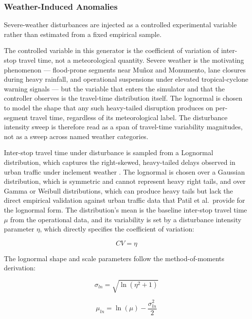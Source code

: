 \subsubsection{Weather-Induced Anomalies}

Severe-weather disturbances are injected as a controlled experimental variable rather than estimated from a fixed empirical sample.

The controlled variable in this generator is the coefficient of variation of inter-stop travel time, not a meteorological quantity. Severe weather is the motivating phenomenon --- flood-prone segments near Mu\~{n}oz and Monumento, lane closures during heavy rainfall, and operational suspensions under elevated tropical-cyclone warning signals \cite{DOTr2020Suspension} --- but the variable that enters the simulator and that the controller observes is the travel-time distribution itself. The lognormal is chosen to model the shape that any such heavy-tailed disruption produces on per-segment travel time, regardless of its meteorological label. The disturbance intensity sweep is therefore read as a span of travel-time variability magnitudes, not as a sweep across named weather categories.

Inter-stop travel time under disturbance is sampled from a Lognormal distribution, which captures the right-skewed, heavy-tailed delays observed in urban traffic under inclement weather \cite{Patil2025Conformal}. The lognormal is chosen over a Gaussian distribution, which is symmetric and cannot represent heavy right tails, and over Gamma or Weibull distributions, which can produce heavy tails but lack the direct empirical validation against urban traffic data that Patil et al.\ provide for the lognormal form. The distribution's mean is the baseline inter-stop travel time $\mu$ from the operational data, and its variability is set by a disturbance intensity parameter $\eta$, which directly specifies the coefficient of variation:

\begin{equation} CV = \eta \label{eq:cv_eta} \end{equation}

The lognormal shape and scale parameters follow the method-of-moments derivation:

\begin{equation} \sigma_{ln} = \sqrt{\ln(\eta^2 + 1)} \label{eq:sigma_ln} \end{equation}

\begin{equation} \mu_{ln} = \ln(\mu) - \frac{\sigma_{ln}^2}{2} \label{eq:mu_ln} \end{equation}

